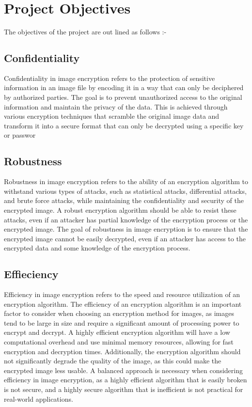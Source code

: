 \documentclass[11pt,a4paper,english]{article}
\begin{document}
\section{Project Objectives}
\paragraph{}
The objectives of the project are out lined as follows :-
\subsection{Confidentiality}Confidentiality in image encryption refers to the protection of sensitive information in an image file by encoding it in a way that can only be deciphered by authorized parties. The goal is to prevent unauthorized access to the original information and maintain the privacy of the data. This is achieved through various encryption techniques that scramble the original image data and transform it into a secure format that can only be decrypted using a specific key or passwor
\subsection{Robustness}Robustness in image encryption refers to the ability of an encryption algorithm to withstand various types of attacks, such as statistical attacks, differential attacks, and brute force attacks, while maintaining the confidentiality and security of the encrypted image. A robust encryption algorithm should be able to resist these attacks, even if an attacker has partial knowledge of the encryption process or the encrypted image. The goal of robustness in image encryption is to ensure that the encrypted image cannot be easily decrypted, even if an attacker has access to the encrypted data and some knowledge of the encryption process.
\subsection{Effieciency}Efficiency in image encryption refers to the speed and resource utilization of an encryption algorithm. The efficiency of an encryption algorithm is an important factor to consider when choosing an encryption method for images, as images tend to be large in size and require a significant amount of processing power to encrypt and decrypt. A highly efficient encryption algorithm will have a low computational overhead and use minimal memory resources, allowing for fast encryption and decryption times. Additionally, the encryption algorithm should not significantly degrade the quality of the image, as this could make the encrypted image less usable. A balanced approach is necessary when considering efficiency in image encryption, as a highly efficient algorithm that is easily broken is not secure, and a highly secure algorithm that is inefficient is not practical for real-world applications.\\
\end{document}

